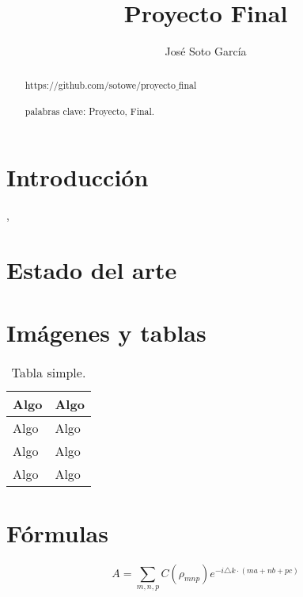 \documentclass[a4paper]{article}
\title{Proyecto Final}
\author{José Soto García}
\begin{document}
\maketitle
\begin{abstract}
https://github.com/sotowe/proyecto$\_$final\\\\
palabras clave: Proyecto, Final. 
\end{abstract}
\section{Introducción}
\cite{bransden2000},\cite{kittel1963quantum}
\section{Estado del arte}
\section{Imágenes y tablas}
\begin{table}[h]
\begin{center}
\begin{tabular}{|l|l|}
\hline
Algo & Algo \\
\hline \hline
Algo & Algo \\ \hline
Algo & Algo \\ \hline
Algo & Algo \\ \hline
\end{tabular}
\caption{Tabla simple.}
\label{tabla:sencilla}
\end{center}
\end{table}
\section{Fórmulas}
$$A=\sum_{m,n,p}C(\rho_{mnp})e^{-i\triangle k\cdot(ma+nb+pc)}$$

\printbibliography
\end{document}
